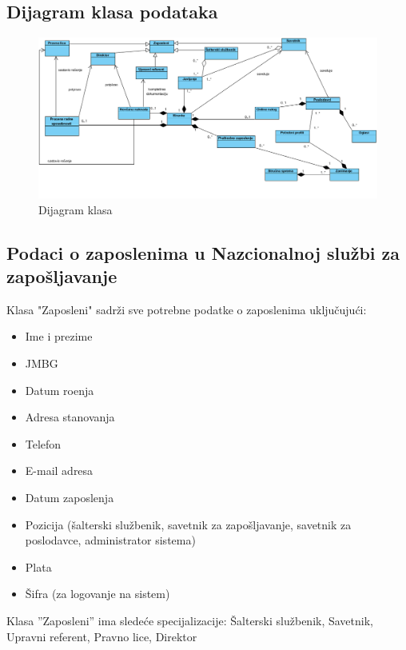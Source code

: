 \begin{mylandscape}
\subsection{Dijagram klasa podataka}

\begin{figure}[H]
	\centering
	\includegraphics[width=0.85\paperwidth]{dijagrami/dijagrami-klasa/dijagrami-klasa.png}
	\caption{Dijagram klasa}
	\label{dk}
\end{figure}
\end{mylandscape}


\subsection{Podaci o zaposlenima u Nazcionalnoj slu\v zbi za zapo\v sljavanje}

Klasa "Zaposleni" sadr\v zi sve potrebne podatke o zaposlenima uklju\v cuju\' ci:
\begin{itemize}
	\item Ime i prezime
	\item JMBG
	\item Datum ro\dj enja
	\item Adresa stanovanja
	\item Telefon
	\item E-mail adresa
	\item Datum zaposlenja
	\item Pozicija (\v salterski slu\v zbenik, savetnik za zapo\v sljavanje, savetnik za poslodavce, administrator sistema)
	\item Plata
	\item \v Sifra (za logovanje na sistem)
\end{itemize}

\noindent Klasa ''Zaposleni'' ima slede\' ce specijalizacije: \v Salterski slu\v zbenik, Savetnik, Upravni referent, Pravno lice, Direktor

